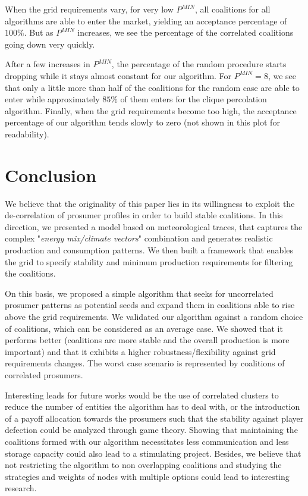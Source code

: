 \documentclass[conference]{IEEEtran}
\begin{document}
\begin{minipage}{\textwidth}
\begin{multicols}{2}
When the grid requirements vary, for very low $ P^{MIN} $, all coalitions for all algorithms are able to enter the market, yielding an acceptance percentage of $ 100 \% $. But as $ P^{MIN} $ increases, we see the percentage of the correlated coalitions going down very quickly. 

After a few increases in $ P^{MIN} $, the percentage of the random procedure starts dropping while it stays almost constant for our algorithm. For $ P^{MIN} = 8 $, we see that only a little more than half of the coalitions for the random case are able to enter while approximately $ 85 \%$ of them enters for the clique percolation algorithm. Finally, when the grid requirements become too high, the acceptance percentage of our algorithm tends slowly to zero (not shown in this plot for readability).

%
%
\section{Conclusion}
\label{sec:conclusion}

We believe that the originality of this paper lies in its willingness to exploit the de-correlation of prosumer profiles in order to build stable coalitions. In this direction, we presented a model based on meteorological traces, that captures the complex "\textit{energy mix/climate vectors}" combination and generates realistic production and consumption patterns. We then built a framework that enables the grid to specify stability and minimum production requirements for filtering the coalitions. 

On this basis, we proposed a simple algorithm that seeks for uncorrelated prosumer patterns as potential seeds and expand them in coalitions able to rise above the grid requirements. We validated our algorithm against a random choice of coalitions, which can be considered as an average case. We showed  that it performs better (coalitions are more stable and the overall production is more important) and that it exhibits a higher robustness/flexibility against grid requirements changes. The worst case scenario is represented by coalitions of correlated prosumers. 

Interesting leads for future works would be the use of correlated clusters to reduce the number of entities the algorithm has to deal with, or the introduction of a payoff allocation towards the prosumers such that the stability against player defection could be analyzed through game theory. Showing that maintaining the coalitions formed with our algorithm necessitates less communication and less storage capacity could also lead to a stimulating project. Besides, we believe that not restricting the algorithm to non overlapping coalitions and studying the strategies and weights of nodes with multiple options could lead to interesting research.


\end{multicols}
\end{minipage}
\end{document}
